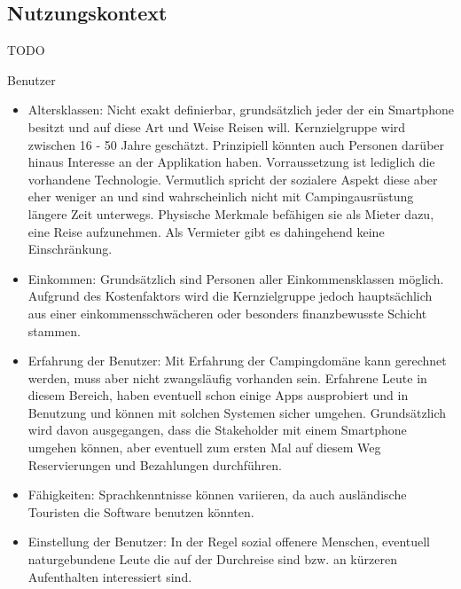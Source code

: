 
\subsection{Nutzungskontext}
TODO

Benutzer
\begin{itemize}
   \item 
   Altersklassen: Nicht exakt definierbar, grundsätzlich jeder der ein Smartphone besitzt und auf diese Art und Weise Reisen will. Kernzielgruppe wird zwischen 16 - 50 Jahre geschätzt. Prinzipiell könnten auch Personen darüber hinaus Interesse an der Applikation haben. Vorraussetzung ist lediglich die vorhandene Technologie. Vermutlich spricht der sozialere Aspekt diese aber eher weniger an und sind wahrscheinlich nicht mit Campingausrüstung längere Zeit unterwegs. Physische Merkmale befähigen sie als Mieter dazu, eine Reise aufzunehmen. Als Vermieter gibt es dahingehend keine Einschränkung.

   \item 
   Einkommen: Grundsätzlich sind Personen aller Einkommensklassen möglich. Aufgrund des Kostenfaktors wird die Kernzielgruppe jedoch hauptsächlich aus einer einkommensschwächeren oder besonders finanzbewusste Schicht stammen.

   \item 
   Erfahrung der Benutzer: Mit Erfahrung der Campingdomäne kann gerechnet werden, muss aber nicht zwangsläufig vorhanden sein.
   Erfahrene Leute in diesem Bereich, haben eventuell schon einige Apps ausprobiert und in Benutzung und können mit solchen Systemen sicher umgehen.
   Grundsätzlich wird davon ausgegangen, dass die Stakeholder mit einem Smartphone umgehen können, aber eventuell zum ersten Mal auf diesem Weg Reservierungen und Bezahlungen durchführen. 

   \item
   Fähigkeiten: Sprachkenntnisse können variieren, da auch ausländische Touristen die Software benutzen könnten.

   \item 
   Einstellung der Benutzer: In der Regel sozial offenere Menschen, eventuell naturgebundene Leute die auf der Durchreise sind bzw. an kürzeren Aufenthalten interessiert sind. 

   
\end{itemize}

\newpage

